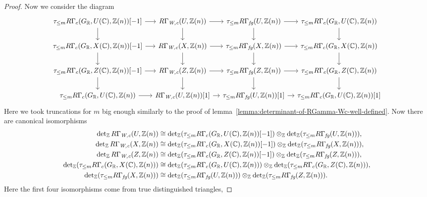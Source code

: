 \documentclass{article}
\numberwithin{equation}{section}
\begin{document}
\begin{lemma}
\begin{proof}
    Now we consider the diagram
    \[ \begin{tikzcd}[column sep=1em]
        \tau_{\le m} R\Gamma_c (G_\RR, U (\CC), \ZZ (n))[-1] \ar{r}\ar{d} & R\Gamma_\Wc (U, \ZZ (n))\ar{d}\ar{r} & \tau_{\le m} R\Gamma_\fg (U,\ZZ(n)) \ar{d}\ar{r} & \tau_{\le m} R\Gamma_c (G_\RR, U (\CC), \ZZ (n)) \ar{d} \\
        \tau_{\le m} R\Gamma_c (G_\RR, X (\CC), \ZZ (n))[-1] \ar{r}\ar{d} & R\Gamma_\Wc (X, \ZZ (n))\ar{d}\ar{r} & \tau_{\le m} R\Gamma_\fg (X,\ZZ(n)) \ar{d}\ar{r} & \tau_{\le m} R\Gamma_c (G_\RR, X (\CC), \ZZ (n)) \ar{d} \\
        \tau_{\le m} R\Gamma_c (G_\RR, Z (\CC), \ZZ (n))[-1] \ar{r}\ar{d} & R\Gamma_\Wc (Z, \ZZ (n))\ar{d}\ar{r} & \tau_{\le m} R\Gamma_\fg (Z,\ZZ(n)) \ar{d}\ar{r} & \tau_{\le m} R\Gamma_c (G_\RR, Z (\CC), \ZZ (n)) \ar{d} \\
        \tau_{\le m} R\Gamma_c (G_\RR, U (\CC), \ZZ (n)) \ar{r} & R\Gamma_\Wc (U, \ZZ (n)) [1] \ar{r} & \tau_{\le m} R\Gamma_\fg (U,\ZZ(n)) [1] \ar{r} & \tau_{\le m} R\Gamma_c (G_\RR, U (\CC), \ZZ (n)) [1]
      \end{tikzcd} \]
    Here we took truncations for $m$ big enough similarly to the proof of
    lemma~\ref{lemma:determinant-of-RGamma-Wc-well-defined}. Now there are
    canonical isomorphisms
    \begin{align*}
      \notag \operatorname{det}_{\mathbb{Z}} R\Gamma_{\text{\it W,c}} (U, \mathbb{Z}(n)) & \cong \operatorname{det}_{\mathbb{Z}} (\tau_{\le m} R\Gamma_c (G_{\mathbb{R}}, U (\mathbb{C}), \mathbb{Z} (n)) [-1]) \otimes_{\mathbb{Z}} \operatorname{det}_{\mathbb{Z}} (\tau_{\le m} R\Gamma_{\text{\it fg}} (U, \mathbb{Z}(n))), \\
      \notag \operatorname{det}_{\mathbb{Z}} R\Gamma_{\text{\it W,c}} (X, \mathbb{Z}(n)) & \cong \operatorname{det}_{\mathbb{Z}} (\tau_{\le m} R\Gamma_c (G_{\mathbb{R}}, X (\mathbb{C}), \mathbb{Z} (n)) [-1]) \otimes_{\mathbb{Z}} \operatorname{det}_{\mathbb{Z}} (\tau_{\le m} R\Gamma_{\text{\it fg}} (X, \mathbb{Z}(n))), \\
      \notag \operatorname{det}_{\mathbb{Z}} R\Gamma_{\text{\it W,c}} (Z, \mathbb{Z}(n)) & \cong \operatorname{det}_{\mathbb{Z}} (\tau_{\le m} R\Gamma_c (G_{\mathbb{R}}, Z (\mathbb{C}), \mathbb{Z} (n)) [-1]) \otimes_{\mathbb{Z}} \operatorname{det}_{\mathbb{Z}} (\tau_{\le m} R\Gamma_{\text{\it fg}} (Z, \mathbb{Z}(n))), \\
      \operatorname{det}_{\mathbb{Z}} (\tau_{\le m} R\Gamma_c (G_{\mathbb{R}}, X (\mathbb{C}), \mathbb{Z}(n))) & \cong \operatorname{det}_{\mathbb{Z}} (\tau_{\le m} R\Gamma_c (G_{\mathbb{R}}, U (\mathbb{C}), \mathbb{Z} (n))) \otimes_{\mathbb{Z}} \operatorname{det}_{\mathbb{Z}} (\tau_{\le m} R\Gamma_c (G_{\mathbb{R}}, Z (\mathbb{C}), \mathbb{Z}(n))), \\
      \operatorname{det}_{\mathbb{Z}} (\tau_{\le m} R\Gamma_{\text{\it fg}} (X, \mathbb{Z}(n))) & \cong \operatorname{det}_{\mathbb{Z}} (\tau_{\le m} R\Gamma_{\text{\it fg}} (U, \mathbb{Z} (n))) \otimes_{\mathbb{Z}} \operatorname{det}_{\mathbb{Z}} (\tau_{\le m} R\Gamma_{\text{\it fg}} (Z, \mathbb{Z}(n))).
    \end{align*}
    Here the first four isomorphisms come from true distinguished triangles,

\end{proof}
\end{lemma}
\end{document}
